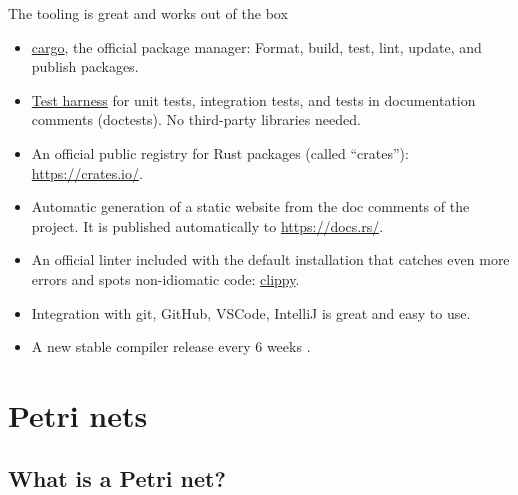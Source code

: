 \documentclass{beamer}
\begin{document}
\begin{frame}{The tooling is great and works out of the box}
  \begin{itemize}
    \item \href{https://doc.rust-lang.org/stable/cargo/}{cargo},
          the official package manager: Format, build, test, lint, update, and publish packages.
    \pause
    \item \href{https://doc.rust-lang.org/book/ch11-00-testing.html}{Test harness}
          for unit tests, integration tests, and tests in documentation comments (doctests).
          No third-party libraries needed.
    \pause
    \item An official public registry for Rust packages (called ``crates''): \url{https://crates.io/}.
    \pause
    \item Automatic generation of a static website from the doc comments of the project.
          It is published automatically to \url{https://docs.rs/}.
    \pause
    \item An official linter included with the default installation that catches even more errors
          and spots non-idiomatic code: \href{https://github.com/rust-lang/rust-clippy}{clippy}.
    \pause
    \item Integration with git, GitHub, VSCode, IntelliJ is great and easy to use.
    \pause
    \item A new stable compiler release every 6 weeks \cite{albini2019}.
  \end{itemize}
\end{frame}

\section{Petri nets}

\subsection{What is a Petri net?}
\end{document}
